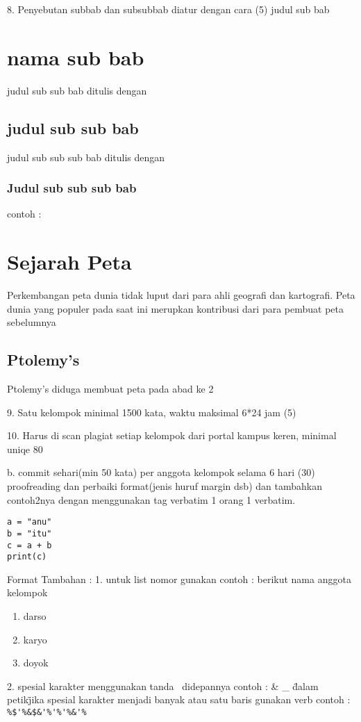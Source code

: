 	
		8. Penyebutan subbab dan subsubbab diatur dengan cara (5)
			judul sub bab \section{nama sub bab}
			judul sub sub bab ditulis dengan \subsection{judul sub sub bab}
			judul sub sub sub bab ditulis dengan \subsubsection{Judul sub sub sub bab}
			contoh :
			\section{Sejarah Peta}
			Perkembangan peta dunia tidak luput dari para ahli geografi dan kartografi. Peta dunia yang populer pada saat ini merupkan kontribusi dari para 
			pembuat peta sebelumnya

			\subsection{Ptolemy's}
			Ptolemy's diduga membuat peta pada abad ke 2
	
		9. Satu kelompok minimal 1500 kata, waktu maksimal 6*24 jam (5)

		10. Harus di scan plagiat setiap kelompok dari portal kampus keren, minimal uniqe 80%



b. commit sehari(min 50 kata) per anggota kelompok selama 6 hari (30) proofreading dan perbaiki format(jenis huruf margin dsb) dan tambahkan contoh2nya dengan menggunakan tag verbatim 1 orang 1 verbatim.


\begin{verbatim}
a = "anu"
b = "itu"
c = a + b
print(c) 
\end{verbatim}




Format Tambahan :
1. untuk list nomor gunakan
	contoh :
	berikut nama anggota kelompok
\begin{enumerate}
	\item darso
	\item karyo
	\item doyok
\end{enumerate}

2. spesial karakter menggunakan tanda \ didepannya
	contoh :
	\&
	\_
	\"dalam petik\"
	jika spesial karakter menjadi banyak atau satu baris gunakan verb
	contoh :
	\verb|%$'%&$&'%'%'%&'%|
	
